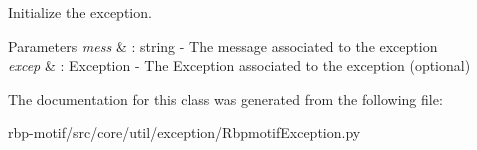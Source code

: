 Initialize the exception. 


\begin{DoxyParams}{Parameters}
{\em mess} & \-: string -\/ The message associated to the exception \\
\hline
{\em excep} & \-: Exception -\/ The Exception associated to the exception (optional) \\
\hline
\end{DoxyParams}


The documentation for this class was generated from the following file\-:\begin{DoxyCompactItemize}
\item 
rbp-\/motif/src/core/util/exception/Rbpmotif\-Exception.\-py\end{DoxyCompactItemize}
